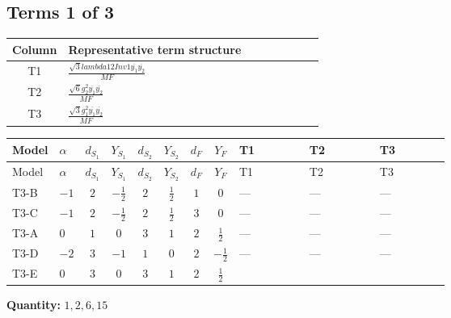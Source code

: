 \documentclass[8pt]{article}
\begin{document}
\begin{landscape}
\subsection*{Terms 1 of 3}
\begin{center}
\begin{tabular}{@{}c >{\raggedright\arraybackslash}p{0.82\linewidth}@{}}
\toprule
Column & Representative term structure \\
\midrule
T1 & \(\displaystyle \frac{\sqrt{3} lambda12Inv1 \overline{y_{1}} \overline{y_{2}}}{MF}\) \\
\midrule
T2 & \(\displaystyle \frac{\sqrt{6} g_{2}^{2} \overline{y_{1}} \overline{y_{2}}}{MF}\) \\
\midrule
T3 & \(\displaystyle \frac{\sqrt{3} g_{1}^{2} \overline{y_{1}} \overline{y_{2}}}{MF}\) \\
\midrule
\bottomrule
\end{tabular}
\end{center}
\smallskip
\tiny
\begin{longtable}{@{}llcccccc >{\raggedright\arraybackslash}p{0.21\linewidth} >{\raggedright\arraybackslash}p{0.21\linewidth} >{\raggedright\arraybackslash}p{0.21\linewidth}@{}}
\toprule
Model & $\alpha$ & $d_{S_1}$ & $Y_{S_1}$ & $d_{S_2}$ & $Y_{S_2}$ & $d_F$ & $Y_F$ & T1 & T2 & T3 \\
\midrule
\endfirsthead
\toprule
Model & $\alpha$ & $d_{S_1}$ & $Y_{S_1}$ & $d_{S_2}$ & $Y_{S_2}$ & $d_F$ & $Y_F$ & T1 & T2 & T3 \\
\midrule
\endhead
T3-B & $-1$ & $2$ & $-\frac{1}{2}$ & $2$ & $\frac{1}{2}$ & $1$ & $0$ & --- & --- & --- \\
\midrule
T3-C & $-1$ & $2$ & $-\frac{1}{2}$ & $2$ & $\frac{1}{2}$ & $3$ & $0$ & --- & --- & --- \\
\midrule
T3-A & $0$ & $1$ & $0$ & $3$ & $1$ & $2$ & $\frac{1}{2}$ & --- & --- & --- \\
\midrule
T3-D & $-2$ & $3$ & $-1$ & $1$ & $0$ & $2$ & $-\frac{1}{2}$ & --- & --- & --- \\
\midrule
T3-E & $0$ & $3$ & $0$ & $3$ & $1$ & $2$ & $\frac{1}{2}$ & \scriptsize\adjustbox{max width=\linewidth}{$\begin{gathered} - \frac{\sqrt{3} lambda12Inv1 \overline{y_{1}} \overline{y_{2}}}{6 MF}\end{gathered}$} & \scriptsize\adjustbox{max width=\linewidth}{$\begin{gathered} \frac{\sqrt{6} g_{2}^{2} \overline{y_{1}} \overline{y_{2}}}{6 MF}\end{gathered}$} & \scriptsize\adjustbox{max width=\linewidth}{$\begin{gathered} \frac{\sqrt{3} g_{1}^{2} \overline{y_{1}} \overline{y_{2}}}{8 MF}\end{gathered}$} \\
\midrule
\bottomrule
\end{longtable}
\clearpage
\noindent\textbf{Quantity: }$\mathrm{1,2,6,15}$\par\smallskip

\end{landscape}
\end{document}
